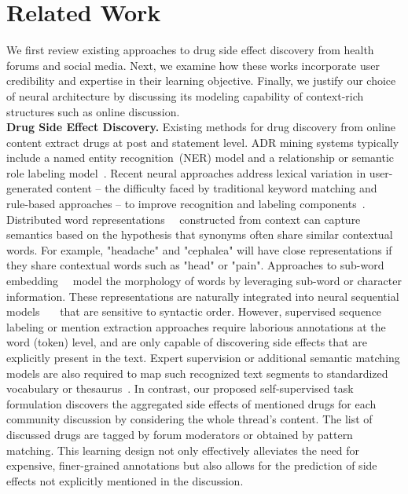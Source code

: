 \documentclass{bmcart}
\begin{document}
\section{Related Work}\label{sec:related_work}

We first review existing approaches to drug side effect discovery from health forums and social media. Next, we examine how these works incorporate user credibility and expertise in their learning objective. Finally, we justify our choice of neural architecture by discussing its modeling capability of context-rich structures such as online discussion. \\

{\bf Drug Side Effect Discovery.} Existing methods for drug discovery from online content extract drugs at post and statement level. ADR mining systems typically include 
a named entity recognition~(NER) model and a relationship or semantic role labeling model~\cite{sampathkumar2014mining,liu2018patient}. 
Recent neural approaches address lexical variation in user-generated content -- the difficulty faced by traditional keyword matching and rule-based approaches -- to improve recognition and labeling components~\cite{ding2018attentive,wunnava2019adverse}. 
Distributed word representations~\cite{mikolov2013distributed}~\cite{pennington2014glove} constructed from context can capture semantics based on the hypothesis that synonyms often share similar contextual words. For example, "headache" and "cephalea" will have close representations if they share contextual words such as "head" or "pain". Approaches to sub-word embedding~\cite{bojanowski2017enriching}~\cite{akbik2019flair} model the morphology of words by leveraging sub-word or character information. These representations are naturally integrated into neural sequential models~\cite{kim2014convolutional}~\cite{sutskever2014sequence}~\cite{devlin2019bert} that are sensitive to syntactic order. 
However, supervised sequence labeling or mention extraction approaches require laborious annotations at the word (token) level, and are only capable of discovering side effects that are explicitly present in the text. Expert supervision or additional semantic matching models are also required to map such recognized text segments to standardized vocabulary or thesaurus~\cite{yates2015extracting}. In contrast, our proposed self-supervised task formulation discovers the aggregated side effects of mentioned drugs for each community discussion by considering the whole thread's content. The list of discussed drugs are tagged by forum moderators or obtained by pattern matching. This learning design not only effectively alleviates the need for expensive, finer-grained annotations but also allows for the prediction of side effects not explicitly mentioned in the discussion. \\
\end{document}
